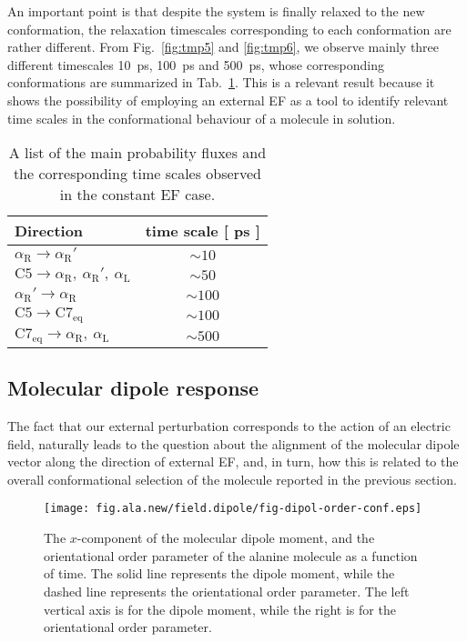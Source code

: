 \documentclass[a4paper,preprint,unsortedaddress,onecolumn]{revtex4-1}
\newcommand{\recheck}[1]{{\color{red} #1}}
\newcommand{\confaa}[0]{{\alpha_{\textrm{R}}}}
\newcommand{\confab}[0]{{\alpha_{\textrm{R}}'}}
\newcommand{\confba}[0]{{\textrm{C}7_{\textrm{eq}}}}
\newcommand{\confbb}[0]{{\textrm{C}5}}
\newcommand{\confc}[0]{{\alpha_{\textrm{L}}}}
\begin{document}
An important point is that despite the system is finally relaxed to the new conformation,
the relaxation timescales corresponding to each conformation are rather different. 
From Fig.~\ref{fig:tmp5} and \ref{fig:tmp6}, we observe mainly
three different timescales 10~ps, 100~ps and 500~ps,
whose corresponding conformations are summarized in Tab.~\ref{tab:tmp1}.
This is a relevant result because it shows the possibility of employing an external EF as a tool to identify relevant time scales in the conformational behaviour of a molecule in solution.

\begin{table}
  \centering
  \begin{tabular*}{0.4\textwidth}{@{\extracolsep{\fill}}lc}\hline\hline
    Direction        & time scale [ ps ] \\\hline
    $\confaa\rightarrow \confab$        &       $\sim 10$      \\
    $\confbb\rightarrow \confaa,\ \confab,\ \confc$        &       $\sim 50$      \\    
    $\confab\rightarrow \confaa$        &       $\sim 100$      \\
    $\confbb\rightarrow \confba$        &       $\sim 100$      \\    
    $\confba\rightarrow \confaa,\ \confc$        &       $\sim 500$      \\    \hline\hline
  \end{tabular*}
  \caption{A list of the main probability fluxes and the corresponding time scales observed in the constant EF case.}
  \label{tab:tmp1}
\end{table}



\subsection{Molecular dipole response}
The fact that our external perturbation corresponds to the action of
an electric field, naturally leads to the question 
\recheck{
  about the alignment of the molecular dipole vector along the direction of external EF}, and, in turn, how this is related
to the overall \recheck{conformational selection} of the molecule reported in
the previous section.
\begin{figure}
  \centering
  \texttt{[image: fig.ala.new/field.dipole/fig-dipol-order-conf.eps]}
  \caption{The
    $x$-component of the molecular dipole moment, and the orientational order parameter
    of the alanine molecule as a
    function of time. The solid line represents the dipole moment,
    while the dashed line represents the orientational order parameter.
    The left vertical axis is for the dipole moment, while
    the right is for the orientational order parameter.
  }
  \label{fig:tmp3}
\end{figure}
\end{document}
